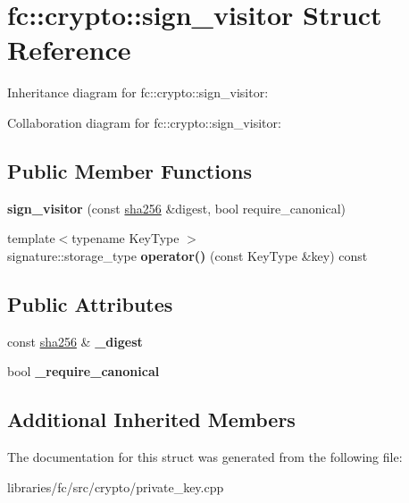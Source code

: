 \hypertarget{structfc_1_1crypto_1_1sign__visitor}{}\section{fc\+:\+:crypto\+:\+:sign\+\_\+visitor Struct Reference}
\label{structfc_1_1crypto_1_1sign__visitor}


Inheritance diagram for fc\+:\+:crypto\+:\+:sign\+\_\+visitor\+:


Collaboration diagram for fc\+:\+:crypto\+:\+:sign\+\_\+visitor\+:
\subsection*{Public Member Functions}
\begin{DoxyCompactItemize}
\item 
\mbox{\label{structfc_1_1crypto_1_1sign__visitor_adc9b9baa50b4d0d0b5c623ed421204da}} 
{\bfseries sign\+\_\+visitor} (const \mbox{\hyperlink{classfc_1_1sha256}{sha256}} \&digest, bool require\+\_\+canonical)
\item 
\mbox{\label{structfc_1_1crypto_1_1sign__visitor_a989423f20ea00fcf5a4be99f52618765}} 
{\footnotesize template$<$typename Key\+Type $>$ }\\signature\+::storage\+\_\+type {\bfseries operator()} (const Key\+Type \&key) const
\end{DoxyCompactItemize}
\subsection*{Public Attributes}
\begin{DoxyCompactItemize}
\item 
\mbox{\label{structfc_1_1crypto_1_1sign__visitor_a8a9aaf9816d368680b20fa099bac4825}} 
const \mbox{\hyperlink{classfc_1_1sha256}{sha256}} \& {\bfseries \+\_\+digest}
\item 
\mbox{\label{structfc_1_1crypto_1_1sign__visitor_a8636832abe6a4cf023c173617d50157d}} 
bool {\bfseries \+\_\+require\+\_\+canonical}
\end{DoxyCompactItemize}
\subsection*{Additional Inherited Members}


The documentation for this struct was generated from the following file\+:\begin{DoxyCompactItemize}
\item 
libraries/fc/src/crypto/private\+\_\+key.\+cpp\end{DoxyCompactItemize}
